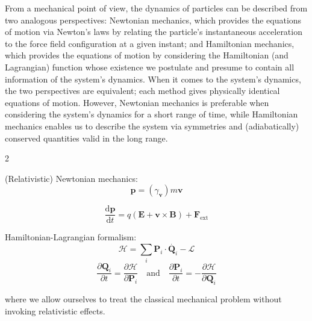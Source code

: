 From a mechanical point of view, the dynamics of particles can be described from two analogous perspectives: Newtonian mechanics, which provides the equations of motion via Newton's laws by relating the particle's instantaneous acceleration to the force field configuration at a given instant; and Hamiltonian mechanics, which provides the equations of motion by considering the Hamiltonian (and Lagrangian) function whose existence we postulate and presume to contain all information of the system's dynamics. When it comes to the system's dynamics, the two perspectives are equivalent; each method gives physically identical equations of motion. However, Newtonian mechanics is preferable when considering the system's dynamics for a short range of time, while Hamiltonian mechanics enables us to describe the system via symmetries and (adiabatically) conserved quantities valid in the long range.

\begin{multicols}{2}

\begin{center}
    (Relativistic) Newtonian mechanics:
    \begin{equation}
        \mathbf{p}=\left(\gamma_{\mathbf{v}}\right)m \mathbf{v}
    \end{equation}
    
    \begin{equation}
        \frac{\mathrm{d}\mathbf{p}}{\mathrm{d}t}=q \left(\mathbf{E}+\mathbf{v}\times \mathbf{B}\right)+\mathbf{F}_{\mathrm{ext}}
    \end{equation}
\end{center}

\columnbreak

\begin{center}
    Hamiltonian-Lagrangian formalism:
    \begin{equation}
        \mathcal{H}=\sum_{i}\mathbf{P}_i\cdot\dot{\mathbf{Q}_i}-\mathcal{L}
    \end{equation}
    \begin{equation}
        \frac{\partial \mathbf{Q}_i}{\partial t}=\frac{\partial \mathcal{H}}{\partial \mathbf{P}_i}\quad\text{and}\quad \frac{\partial \mathbf{P}_i}{\partial t}=-\frac{\partial \mathcal{H}}{\partial \mathbf{Q}_i}
    \end{equation}
\end{center}

\end{multicols}

where we allow ourselves to treat the classical mechanical problem without invoking relativistic effects.

